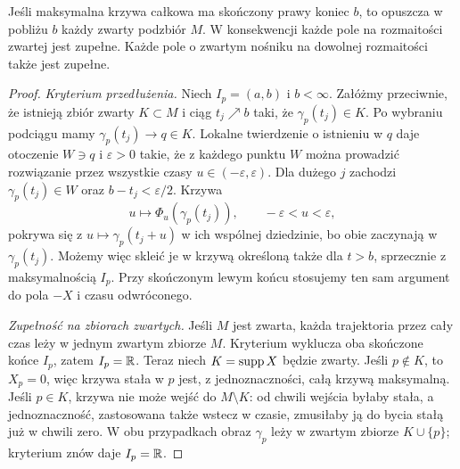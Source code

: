 \begin{twierdzenie}
\label{thm:zupelnosc}
Jeśli maksymalna krzywa całkowa ma skończony prawy koniec $b$, to
opuszcza w pobliżu $b$ każdy zwarty podzbiór $M$.
W konsekwencji każde pole na rozmaitości zwartej jest zupełne.
Każde pole o zwartym nośniku na dowolnej rozmaitości także jest zupełne.
\end{twierdzenie}
\begin{proof}
\emph{Kryterium przedłużenia.}
Niech $I_p=(a,b)$ i $b<\infty$. Załóżmy przeciwnie,
że istnieją zbiór zwarty $K\subset M$ i ciąg
$t_j\nearrow b$ taki, że $\gamma_p(t_j)\in K$.
Po wybraniu podciągu mamy $\gamma_p(t_j)\to q\in K$.
Lokalne twierdzenie o istnieniu w $q$ daje otoczenie
$W\ni q$ i $\varepsilon>0$ takie, że z każdego punktu
$W$ można prowadzić rozwiązanie przez wszystkie czasy
$u\in(-\varepsilon,\varepsilon)$.
Dla dużego $j$ zachodzi $\gamma_p(t_j)\in W$
oraz $b-t_j<\varepsilon/2$.
Krzywa
\[
 u\longmapsto\Phi_u(\gamma_p(t_j)),\qquad
 -\varepsilon<u<\varepsilon,
\]
pokrywa się z $u\mapsto\gamma_p(t_j+u)$ w ich wspólnej
dziedzinie, bo obie zaczynają w $\gamma_p(t_j)$.
Możemy więc skleić je w krzywą określoną także dla
$t> b$, sprzecznie z maksymalnością $I_p$.
Przy skończonym lewym końcu stosujemy ten sam argument
do pola $-X$ i czasu odwróconego.

\emph{Zupełność na zbiorach zwartych.}
Jeśli $M$ jest zwarta, każda trajektoria przez cały czas
leży w jednym zwartym zbiorze $M$. Kryterium wyklucza
oba skończone końce $I_p$, zatem $I_p=\mathbb{R}$.
Teraz niech $K=\operatorname{supp} X$ będzie zwarty.
Jeśli $p\notin K$, to $X_p=0$, więc krzywa
stała w $p$ jest, z jednoznaczności, całą krzywą
maksymalną. Jeśli $p\in K$, krzywa nie może wejść
do $M\setminus K$: od chwili wejścia byłaby stała,
a jednoznaczność, zastosowana także wstecz w czasie,
zmusiłaby ją do bycia stałą już w chwili zero.
W obu przypadkach obraz $\gamma_p$ leży w zwartym
zbiorze $K\cup\{p\}$; kryterium znów daje $I_p=\mathbb{R}$.
\end{proof}

